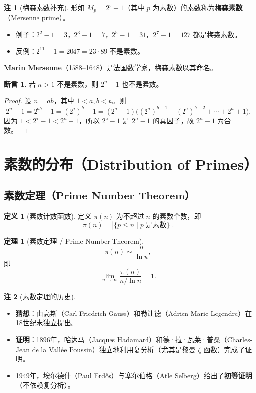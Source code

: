 \documentclass[UTF8,11pt,a4paper]{ctexbook}   %
\theoremstyle{definition}
\newtheorem{definition}{定义}[section]
\newtheorem{theorem}{定理}[section]
\newtheorem{remark}{注}[section]
\newtheorem{proposition}{断言}[section]
\begin{document}
\begin{remark}[梅森素数补充]
形如 $M_p=2^p-1$（其中 $p$ 为素数）的素数称为\textbf{梅森素数}（Mersenne prime）。
\begin{itemize}
    \item 例子：$2^2-1=3$，$2^3-1=7$，$2^5-1=31$，$2^7-1=127$ 都是梅森素数。
    \item 反例：$2^{11}-1=2047=23\cdot 89$ 不是素数。
\end{itemize}

\textbf{Marin Mersenne}（1588--1648）是法国数学家，梅森素数以其命名。
\end{remark}

\begin{proposition}\label{prop:mersenne-composite}
若 $n>1$ 不是素数，则 $2^n-1$ 也不是素数。
\end{proposition}

\begin{proof}
设 $n=ab$，其中 $1<a,b<n$。则
\[
2^n-1 = 2^{ab}-1 = (2^a)^b-1 = (2^a-1)\bigl((2^a)^{b-1} + (2^a)^{b-2} + \cdots + 2^a + 1\bigr).
\]
因为 $1<2^a-1<2^n-1$，所以 $2^a-1$ 是 $2^n-1$ 的真因子，故 $2^n-1$ 为合数。
\end{proof}

\section{素数的分布（Distribution of Primes）}

\subsection{素数定理（Prime Number Theorem）}

\begin{definition}[素数计数函数]
定义 $\pi(n)$ 为不超过 $n$ 的素数个数，即
\[
\pi(n) = |\{p \le n \mid p\text{ 是素数}\}|.
\]
\end{definition}

\begin{theorem}[素数定理 / Prime Number Theorem]
\[
\pi(n) \sim \frac{n}{\ln n},
\]
即
\[
\lim_{n\to\infty} \frac{\pi(n)}{n/\ln n} = 1.
\]
\end{theorem}

\begin{remark}[素数定理的历史]
\begin{itemize}
    \item \textbf{猜想}：由高斯（Carl Friedrich Gauss）和勒让德（Adrien-Marie Legendre）在18世纪末独立提出。
    \item \textbf{证明}：1896年，哈达马（Jacques Hadamard）和德·拉·瓦莱·普桑（Charles-Jean de la Vallée Poussin）独立地利用复分析（尤其是黎曼 $\zeta$ 函数）完成了证明。
    \item 1949年，埃尔德什（Paul Erdős）与塞尔伯格（Atle Selberg）给出了\textbf{初等证明}（不依赖复分析）。
\end{itemize}
\end{remark}
\end{document}
